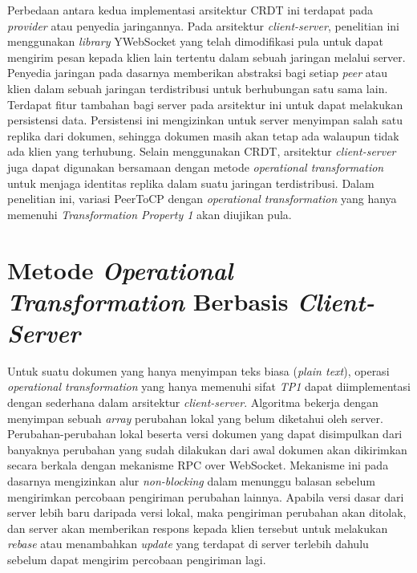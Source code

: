 Perbedaan antara kedua implementasi arsitektur CRDT ini terdapat pada \textit{provider} atau penyedia jaringannya. Pada arsitektur \textit{client-server}, penelitian ini menggunakan \textit{library} YWebSocket yang telah dimodifikasi pula untuk dapat mengirim pesan kepada klien lain tertentu dalam sebuah jaringan melalui server. Penyedia jaringan pada dasarnya memberikan abstraksi bagi setiap \textit{peer} atau klien dalam sebuah jaringan terdistribusi untuk berhubungan satu sama lain. Terdapat fitur tambahan bagi server pada arsitektur ini untuk dapat melakukan persistensi data. Persistensi ini mengizinkan untuk server menyimpan salah satu replika dari dokumen, sehingga dokumen masih akan tetap ada walaupun tidak ada klien yang terhubung. Selain menggunakan CRDT, arsitektur \textit{client-server} juga dapat digunakan bersamaan dengan metode \textit{operational transformation} untuk menjaga identitas replika dalam suatu jaringan terdistribusi. Dalam penelitian ini, variasi PeerToCP dengan \textit{operational transformation} yang hanya memenuhi \textit{Transformation Property 1} akan diujikan pula.



\section{Metode \textit{Operational Transformation} Berbasis \textit{Client-Server}}
\label{sec:design_ot}

Untuk suatu dokumen yang hanya menyimpan teks biasa (\textit{plain text}), operasi \textit{operational transformation} yang hanya memenuhi sifat \textit{TP1} dapat diimplementasi dengan sederhana dalam arsitektur \textit{client-server}. Algoritma bekerja dengan menyimpan sebuah \textit{array} perubahan lokal yang belum diketahui oleh server. Perubahan-perubahan lokal beserta versi dokumen yang dapat disimpulkan dari banyaknya perubahan yang sudah dilakukan dari awal dokumen akan dikirimkan secara berkala dengan mekanisme RPC over WebSocket. Mekanisme ini pada dasarnya mengizinkan alur \textit{non-blocking} dalam menunggu balasan sebelum mengirimkan percobaan pengiriman perubahan lainnya. Apabila versi dasar dari server lebih baru daripada versi lokal, maka pengiriman perubahan akan ditolak, dan server akan memberikan respons kepada klien tersebut untuk melakukan \textit{rebase} atau menambahkan \textit{update} yang terdapat di server terlebih dahulu sebelum dapat mengirim percobaan pengiriman lagi.

